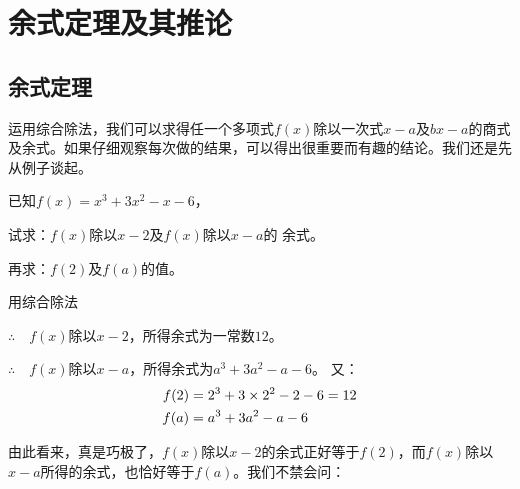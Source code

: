\section{余式定理及其推论}
\subsection{余式定理}
运用综合除法，我们可以求得任一个多项式$f(x)$除以一次式$x-a$及$bx-a$的商式及余式。如果仔细观察每次做的结果，可以得出很重要而有趣的结论。我们还是先从例子谈起。

\begin{example}
已知$f(x)=x^3+3x^2-x-6$，

    试求：$f(x)$除以$x-2$及$f(x)$除以$x-a$的
    余式。

    再求：$f(2)$及$f(a)$的值。
\end{example}

\begin{solution}
用综合除法   
\begin{center}
\end{center}
$\therefore\quad f(x)$除以$x-2$，所得余式为一常数$12$。

\begin{center}
    \end{center}
$\therefore\quad f(x)$除以$x-a$，所得余式为$a^3+3a^2-a-6$。
又：
\[\begin{split}
f(2)&= 2^3+3\times 2^2-2-6=12 \\
f(a)&= a^3+3a^2-a-6   
\end{split}\]
\end{solution}


由此看来，真是巧极了，$f(x)$除以$x-2$的余式正好等于$f(2)$，而$f(x)$除以$x-a$所得的余式，也恰好等于$f(a)$。我们不禁会问：

